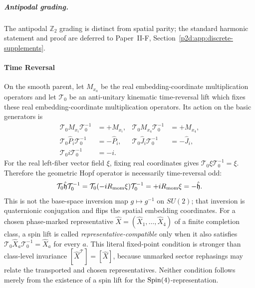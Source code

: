 \documentclass[12pt,a4paper]{article}
\begin{document}
\subparagraph{Antipodal grading.}
The antipodal \(\mathbb Z_2\) grading is distinct from spatial parity; the
standard harmonic statement and proof are deferred to
Paper~II-F, Section~\ref{p2d:app:discrete-supplements}.


\paragraph{Time Reversal}

\begin{definition}
\label{p2:def:time-reversal}
On the smooth parent, let \(M_{x_a}\) be the real embedding-coordinate multiplication operators and let \(\mathcal T_0\)
be an anti-unitary kinematic time-reversal lift which fixes these real
embedding-coordinate multiplication operators.  Its action on the basic
generators is
\begin{align}
\mathcal T_0M_{x_i}\mathcal T_0^{-1} &= +M_{x_i}, &
\mathcal T_0M_{x_4}\mathcal T_0^{-1} &= +M_{x_4}, \\
\mathcal T_0\hat{P}_i\mathcal T_0^{-1} &= -\hat{P}_i, &
\mathcal T_0\hat{J}_i\mathcal T_0^{-1} &= -\hat{J}_i, \\
\mathcal T_0 i\mathcal T_0^{-1} &= -i.
\end{align}
For the real left-fiber vector field \(\xi\), fixing real coordinates gives
\(\mathcal T_0\xi\mathcal T_0^{-1}=\xi\).  Therefore the geometric Hopf
operator is necessarily time-reversal odd:
\begin{equation}
\label{p2:eq:geometric-time-reversal-hopf-odd}
\mathcal T_0\hat{\mathfrak h}\mathcal T_0^{-1}
=\mathcal T_0(-iR_{\mathrm{mom}}\xi)\mathcal T_0^{-1}
=+iR_{\mathrm{mom}}\xi
=-\hat{\mathfrak h}.
\end{equation}
This is not the base-space inversion map $g\mapsto g^{-1}$ on $SU(2)$; that inversion is quaternionic conjugation and flips the spatial embedding coordinates.
For a chosen phase-marked representative
\(\widehat X=(\widehat X_1,\ldots,\widehat X_4)\) of a finite completion
class, a spin lift is called \emph{representative-compatible} only when it
also satisfies
\(\mathcal T_0\widehat X_a\mathcal T_0^{-1}=\widehat X_a\) for every \(a\).
This literal fixed-point condition is stronger than class-level invariance
\([\widehat X^{\mathcal T}]=[\widehat X]\), because unmarked sector
rephasings may relate the transported and chosen representatives.  Neither
condition follows merely from the existence of a spin lift for the
\(\mathrm{Spin}(4)\)-representation.
\end{definition}
\end{document}
